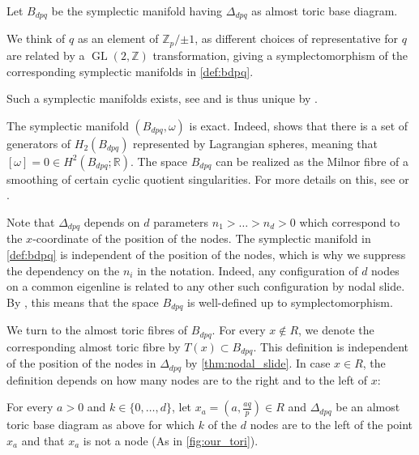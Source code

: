 \documentclass[12pt,a4paper,abstract=true,final]{scrartcl}
\DeclareMathOperator{\GL}{GL}
\begin{document}
\begin{definition}
    \label{def:bdpq}
    Let $B_{dpq}$ be the symplectic manifold having $\Delta_{dpq}$ as almost toric base diagram.
\end{definition}

We think of $q$ as an element of $ℤ_p/{±1}$, as different choices of representative for $q$ are related by a $\GL(2,ℤ)$ transformation, giving a symplectomorphism of the corresponding symplectic manifolds in \cref{def:bdpq}.

Such a symplectic manifolds exists, see \cite[Section 7.4]{evans2021atfs} and is thus unique by \cite[Theorem 8.5]{evans2021atfs}. 

\begin{remark}
    The symplectic manifold $(B_{dpq}, \omega)$ is exact.
    Indeed, \cite[Lemma 7.11]{evans2021atfs} shows that there is a set of generators of $H_2(B_{dpq})$ represented by Lagrangian spheres, meaning that $[\omega] = 0 \in H^2(B_{dpq};\mathbb{R})$.
The space $B_{dpq}$ can be realized as the Milnor fibre of a smoothing of certain cyclic quotient singularities.
For more details on this, see \cite[Section 7.4]{evans2021atfs} or \cite{Eva19}.
\end{remark}

Note that $\Delta_{dpq}$ depends on $d$ parameters $n_1>\ldots>n_d > 0$ which correspond to the $x$-coordinate of the position of the nodes.
The symplectic manifold in \cref{def:bdpq} is independent of the position of the nodes, which is why we suppress the dependency on the $n_i$ in the notation.
Indeed, any configuration of $d$ nodes on a common eigenline is related to any other such configuration by nodal slide.
By \cite[Theorem 8.10]{evans2021atfs}, this means that the space $B_{dpq}$ is well-defined up to symplectomorphism.

We turn to the almost toric fibres of $B_{dpq}$.
For every $x \notin R$, we denote the corresponding almost toric fibre by $T(x) \subset B_{dpq}$.
This definition is independent of the position of the nodes in $\Delta_{dpq}$ by \cref{thm:nodal_slide}.
In case $x \in R$, the definition depends on how many nodes are to the right and to the left of $x$:

For every $a > 0$ and $k \in \{0,\ldots,d\}$, let $x_a = \left( a,\frac{aq}{p} \right) \in R$ and $\Delta_{dpq}$ be an almost toric base diagram as above for which $k$ of the $d$ nodes are to the left of the point $x_a$ and that $x_a$ is not a node (As in \cref{fig:our_tori}).
\end{document}
